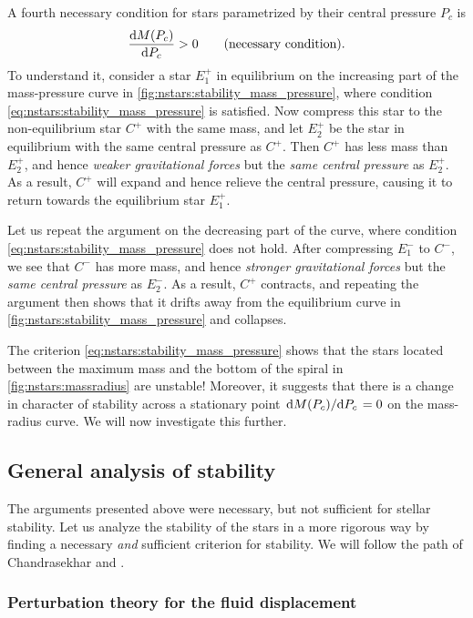 A fourth necessary condition for stars parametrized by their central pressure $P_c$ is
\begin{equation}
	\odv{M(P_c)}{P_c} > 0
	\qquad \text{(necessary condition)} .
\label{eq:nstars:stability_mass_pressure}
\end{equation}
To understand it, consider a star $E_1^+$ in equilibrium on the increasing part of the mass-pressure curve in \cref{fig:nstars:stability_mass_pressure}, where condition \eqref{eq:nstars:stability_mass_pressure} is satisfied.
Now compress this star to the non-equilibrium star $C^+$ with the same mass, and let $E_2^+$ be the star in equilibrium with the same central pressure as $C^+$.
Then $C^+$ has less mass than $E_2^+$, and hence \emph{weaker gravitational forces} but the \emph{same central pressure} as $E_2^+$.
As a result, $C^+$ will expand and hence relieve the central pressure, causing it to return towards the equilibrium star $E_1^+$.

Let us repeat the argument on the decreasing part of the curve, where condition \eqref{eq:nstars:stability_mass_pressure} does not hold.
After compressing $E_1^-$ to $C^-$, we see that $C^-$ has more mass, and hence \emph{stronger gravitational forces} but the \emph{same central pressure} as $E_2^-$.
As a result, $C^+$ contracts, and repeating the argument then shows that it drifts away from the equilibrium curve in \cref{fig:nstars:stability_mass_pressure} and collapses.

The criterion \eqref{eq:nstars:stability_mass_pressure} shows that the stars located between the maximum mass and the bottom of the spiral in \cref{fig:nstars:massradius} are unstable!
Moreover, it suggests that there is a change in character of stability across a stationary point $\odv{M(P_c)}/{P_c} = 0$ on the mass-radius curve.
We will now investigate this further.

\subsection{General analysis of stability}
\label{sec:nstars:stability_general}

The arguments presented above were necessary, but not sufficient for stellar stability.
Let us analyze the stability of the stars in a more rigorous way by finding a necessary \emph{and} sufficient criterion for stability.
We will follow the path of Chandrasekhar \cite{ref:chandrasekhar_stability} and \cite[§26]{ref:mtw}.

\subsubsection{Perturbation theory for the fluid displacement}

